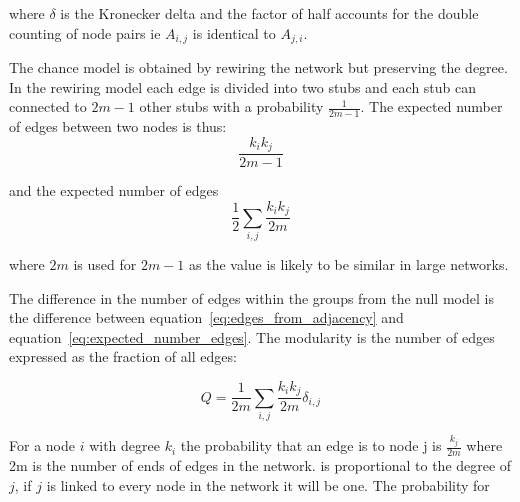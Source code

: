 where $\delta$ is the Kronecker delta and the factor of half accounts for the double counting of node pairs ie $A_{i,j}$ is identical to $A_{j,i}$. 

The chance model is obtained by rewiring the network but preserving the degree. In the rewiring model each edge is divided into two stubs and each stub can connected to ${2m-1}$ other stubs with a probability $\frac{1}{2m-1}$. The expected number of edges between two nodes is thus:
\begin{equation}
    \frac{k_i k_j}{2m-1}
\end{equation}

and the expected number of edges
\begin{equation}
    \frac{1}{2} \sum_{i,j} \frac{k_i k_j}{2m}
    \label{eq:expected_number_edges}
\end{equation}


where $2m$ is used for $2m-1$ as the value is likely to be similar in large networks. 

The difference in the number of edges within the groups from the null model is the difference between equation~\ref{eq:edges_from_adjacency} and equation~\ref{eq:expected_number_edges}. The modularity is the number of edges expressed as the fraction of all edges: 

\begin{equation}
    Q = \frac{1}{2m} \sum_{i,j}\frac{k_i k_j}{2m} \delta_{i,j}
\end{equation}



For a node $i$ with degree $k_i$ the probability that an edge is to node j is $\frac{k_j}{2m}$ where 2m is the number of ends of edges in the network. is proportional to the degree of $j$, if $j$ is linked to every node in the network it will be one. The probability for



